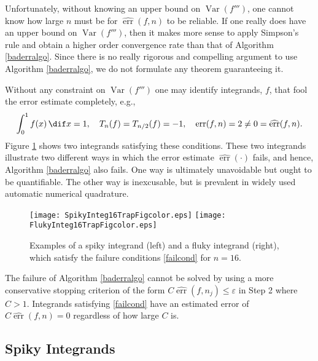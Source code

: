 \documentclass[]{article}
\DeclareMathOperator{\Var}{Var}
\DeclareMathOperator{\err}{err}
\newcommand{\herr}{\widehat{\err}}
\theoremstyle{definition}
\theoremstyle{remark}
\begin{document}
Unfortunately, without knowing an upper bound on $\Var(f''')$, one cannot know how large $n$ must be for $\herr(f,n)$ to be reliable.  If one really does have an upper bound on $\Var(f''')$, then it makes more sense to apply Simpson's rule and obtain a higher order convergence rate than that of Algorithm \ref{baderralgo}.  Since there is no really rigorous and compelling argument to use Algorithm \ref{baderralgo}, we do not formulate any theorem guaranteeing it.

Without any constraint on $\Var(f''')$ one may identify integrands, $f$, that fool the error estimate completely, e.g.,
\begin{equation} \label{failcond}
\int_0^1 f(x) \, \dif x =  1, \quad T_{n}(f)=T_{n/2}(f) = -1, \quad \err(f,n)=2 \ne 0 = \herr(f,n).
\end{equation}
Figure \ref{spikeflukefig} shows two integrands satisfying these conditions. These two integrands illustrate two different ways in which the error estimate $\herr(\cdot)$ fails, and hence, Algorithm \ref{baderralgo} also fails.  One way is ultimately unavoidable but ought to be quantifiable.  The other way is inexcusable, but is prevalent in widely used automatic numerical quadrature.

\begin{figure}
\centering 
\texttt{[image: SpikyInteg16TrapFigcolor.eps]} \qquad
\texttt{[image: FlukyInteg16TrapFigcolor.eps]}
\caption{Examples of a spiky integrand (left) and a fluky integrand (right), which satisfy the failure conditions \eqref{failcond} for $n=16$. \label{spikeflukefig}}
\end{figure}

The failure of Algorithm \ref{baderralgo} cannot be solved by using a more conservative stopping criterion of the form $C\herr(f,n_j) \le \varepsilon$ in Step 2 where $C>1$.  Integrands satisfying \eqref{failcond} have an estimated error of $C\herr(f,n)=0$ regardless of how large $C$ is.

\subsection{Spiky Integrands} 
\end{document}
